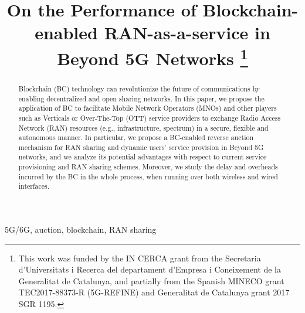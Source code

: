 \documentclass[conference]{IEEEtran}
\theoremstyle{definition}
\begin{document}
\title{On the Performance of Blockchain-enabled RAN-as-a-service in Beyond 5G Networks
\thanks{This work was funded by the IN CERCA grant from the Secretaria d'Universitats i Recerca del departament d'Empresa i Coneixement de la
Generalitat de Catalunya, and partially from the Spanish MINECO grant TEC2017-88373-R (5G-REFINE) and Generalitat de Catalunya grant 2017 SGR 1195.}
}

\author{
\and
{}
}

\maketitle

\begin{abstract}
Blockchain (BC) technology can revolutionize the future of communications by enabling decentralized and open sharing networks. In this paper, we propose the application of BC to facilitate Mobile Network Operators (MNOs) and other players such as Verticals or Over-The-Top (OTT) service providers to exchange Radio Access Network (RAN) resources (e.g., infrastructure, spectrum) in a secure, flexible and autonomous manner. In particular, we propose a BC-enabled reverse auction mechanism for RAN sharing and dynamic users' service provision in Beyond 5G networks, and we analyze its potential advantages with respect to current service provisioning and RAN sharing schemes. Moreover, we study the delay and overheads incurred by the BC in the whole process, when running over both wireless and wired interfaces.
\end{abstract}

\begin{IEEEkeywords}
5G/6G, auction, blockchain, RAN sharing
\end{IEEEkeywords}


\IEEEpeerreviewmaketitle
\end{document}
